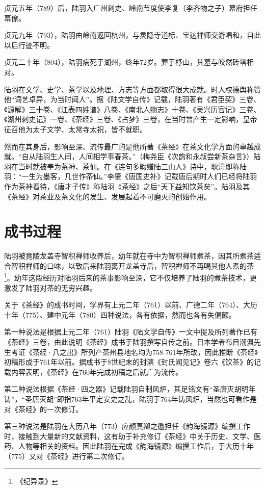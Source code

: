 \documentclass[12pt,UTF8]{ctexbook}
\begin{document}
贞元五年（789）后，陆羽入广州刺史、岭南节度使李复（李齐物之子）幕府担任幕僚。

贞元九年（793），陆羽由岭南返回杭州，与灵隐寺道标、宝达禅师交游唱和，自此以后行迹不明。

贞元二十年（804），陆羽病死于湖州，终年72岁。葬于杼山，其墓与皎然砖塔相对。

陆羽在文学、史学、茶学以及地理、方志等方面都取得很大成就。时人权德舆称赞他“词艺卓异，为当时闻人”。据《陆文学自传》记载，陆羽著有《君臣契》三卷、《源解》三十卷、《江表四姓谱》八卷、《南北人物志》十卷、《吴兴历官记》三卷、《湖州刺史记》一卷、《茶经》三卷、《占梦》三卷，在当时曾产生一定影响，皇帝征召他为太子文学、太常寺太祝，皆不就职。

然而在其身后，影响至深、流传最广的是他所著《茶经》在茶文化学方面的卓越成就。“自从陆羽生人间，人间相学事春茶。”（梅尧臣《次韵和永叔尝新茶杂言》）陆羽在当时就被奉为茶神、茶仙。在《连句多暇赠陆三山人》诗中，耿湋即称陆羽：“一生为墨客，几世作茶仙。”李肇《唐国史补》记载唐后期时人们已经将陆羽作为茶神看待，《唐才子传》称陆羽《茶经》之后“天下益知饮茶矣”。陆羽及其《茶经》对茶业及茶文化的发生、发展起着不可磨灭的创始作用。

\section{成书过程}

陆羽被竟陵龙盖寺智积禅师收养后，幼年就在寺中为智积禅师煮茶，因其所煮茶适合智积禅师的口味，以致后来陆羽离开龙盖寺后，智积禅师不再喝其他人煮的茶\footnote{《纪异录》}。幼年这段经历对陆羽后来的茶事影响至深，它不仅培养了陆羽的煮茶技术，更激发了陆羽对茶的无穷兴趣。

关于《茶经》的成书时间，学界有上元二年（761）以前、广德二年（764）、大历十年（775）、建中元年（780）四种说法，各有依据，然而也各有失偏颇。

第一种说法是根据上元二年（761）陆羽《陆文学自传》一文中提及所列著作已有《茶经》三卷，由此说明《茶经》成书于陆羽撰写自传之前。日本学者布目潮沨先生考证《茶经·八之出》所列产茶州县地名均为758-761年所改，因此推断《茶经》初稿形成于761年以前。据成书于8世纪末的封演《封氏闻见记》卷六《饮茶》的记载内容表明，《茶经》在760年完成初稿之后就广为流传。

第二种说法根据《茶经·四之器》记载陆羽自制风炉，其足铭文有“圣唐灭胡明年铸”，“圣唐灭胡”即指763年平定安史之乱，陆羽于764年铸风炉，当然也可看作是对《茶经》的一次修订。

第三种说法是陆羽在大历八年（773）应颜真卿之邀担任《韵海镜源》编撰工作时，接触到大量新的文献资料，这有助于补充修订《茶经》中关于历史、文学、医药、人物等相关的资料。因此陆羽在完成《韵海镜源》编撰工作后，于大历十年（775）又对《茶经》进行第二次修订。
\end{document}
